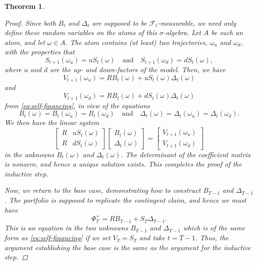 \documentclass[reqno]{amsart}
\newtheorem{thm}{Theorem}[section]
\theoremstyle{definition}
\numberwithin{equation}{section}
\begin{document}
\begin{thm}
\begin{proof}
Since both $B_t$ and $\Delta_t$ are supposed to be $\mathcal{F}_t$-measurable, we need only define these random variables on the atoms of this $\sigma$-algebra. Let $A$ be such an atom, and let $\omega \in A$. The atom contains (at least) two trajectories, $\omega_u$ and $\omega_d$, with the properties that
	\[
S_{t+1}(\omega_u) = u S_{t}(\omega) \quad \text{and} \quad S_{t+1}(\omega_d) = d S_{t}(\omega),
	\]
where $u$ and $d$ are the up- and down-factors of the model. Then, we have
	\[
	V_{t+1}(\omega_u) = R B_{t}(\omega) + uS_{t}(\omega) \Delta_{t}(\omega)
	\]
and
	\[
	V_{t+1}(\omega_d) = R B_{t}(\omega) + dS_{t}(\omega) \Delta_{t}(\omega)
	\]
from \eqref{eq:self-financing}, in view of the equations
	\[B_t(\omega) = B_t(\omega_u) = B_t(\omega_d) \quad \text{and} \quad \Delta_t(\omega) = \Delta_t(\omega_u) = \Delta_t(\omega_d).
	\]
We then have the linear system
	\[
	\begin{bmatrix}
	R & uS_{t}(\omega) \\
	R & dS_{t}(\omega)
	\end{bmatrix}
	\begin{bmatrix} B_{t}(\omega) \\ \Delta_{t}(\omega) \end{bmatrix} =
	\begin{bmatrix}
	V_{t+1}(\omega_u) \\
	V_{t+1}(\omega_d)
	\end{bmatrix}
	\]
in the unknowns $B_{t}(\omega)$ and $\Delta_{t}(\omega)$. The determinant of the coefficient matrix is nonzero, and hence a unique solution exists. This completes the proof of the inductive step.

Now, we return to the base case, demonstrating how to construct $B_{T-1}$ and $\Delta_{T-1}$. The portfolio is supposed to replicate the contingent claim, and hence we must have
	\[
	\Phi_T^+ = RB_{T-1} + S_T \Delta_{T-1}.
	\]
This is an equation in the two unknowns $B_{T-1}$ and $\Delta_{T-1}$ which is of the same form as \eqref{eq:self-financing} if we set $V_T = S_T$ and take $t=T-1$. Thus, the argument establishing the base case is the same as the argument for the inductive step.
\end{proof}
\end{thm}
\end{document}
